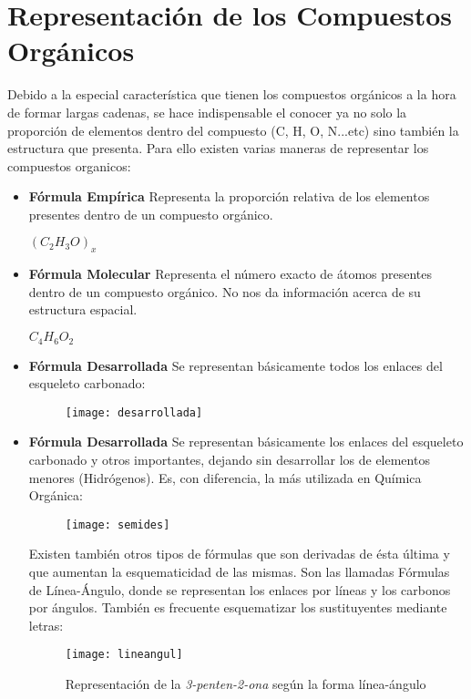 \section{Representación de los Compuestos Orgánicos}
Debido a la especial característica que tienen los compuestos orgánicos a la hora de formar largas cadenas, se hace indispensable el conocer ya no solo la proporción de elementos dentro del compuesto (C, H, O, N...etc) sino también la estructura que presenta. Para ello existen varias maneras de representar los compuestos organicos:\\
\begin{itemize}
	\item \textbf{Fórmula Empírica} Representa la proporción relativa de los elementos presentes dentro de un compuesto orgánico. 
	\begin{center}
		$(C_2H_3O)_x$
	\end{center}
	\item \textbf{Fórmula Molecular} Representa el número exacto de átomos presentes dentro de un compuesto orgánico. No nos da información acerca de su estructura espacial.
	\begin{center}
		$C_4H_6O_2$
	\end{center}
		\item \textbf{Fórmula Desarrollada} Se representan básicamente todos los enlaces del esqueleto carbonado:
		\begin{figure}[h!]
			\centering
			\texttt{[image: desarrollada]}
		\end{figure}
		\item \textbf{Fórmula Desarrollada} Se representan básicamente los enlaces del esqueleto carbonado y otros importantes, dejando sin desarrollar los de elementos menores (Hidrógenos). Es, con diferencia, la más utilizada en Química Orgánica:
			\begin{figure}[h!]
			\centering
			\texttt{[image: semides]}
		\end{figure}
		Existen también otros tipos de fórmulas que son derivadas de ésta última y que aumentan la esquematicidad de las mismas. Son las llamadas Fórmulas de Línea-Ángulo, donde se representan los enlaces por líneas y los carbonos por ángulos. También es frecuente esquematizar los sustituyentes mediante letras:
		\begin{figure}[h!]
			\centering
			\texttt{[image: lineangul]}
			\caption{Representación de la \emph{3-penten-2-ona} según la forma línea-ángulo}
		\end{figure}  
\end{itemize}

